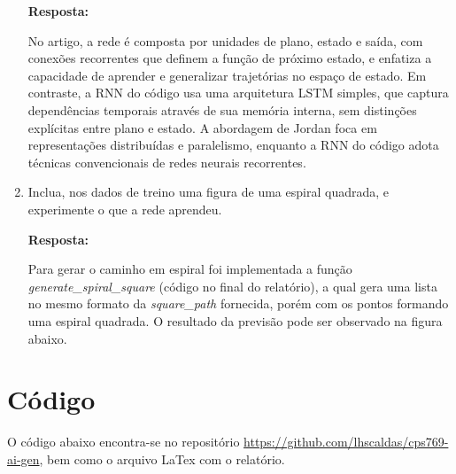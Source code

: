 \documentclass[12 pt]{article}
\begin{document}
\begin{enumerate}
    \textbf{Resposta:} \par

    No artigo, a rede é composta por unidades de plano, estado e saída, com conexões recorrentes que definem a função de próximo estado, e enfatiza a capacidade de aprender e generalizar trajetórias no espaço de estado. Em contraste, a RNN do código usa uma arquitetura LSTM simples, que captura dependências temporais através de sua memória interna, sem distinções explícitas entre plano e estado. A abordagem de Jordan foca em representações distribuídas e paralelismo, enquanto a RNN do código adota técnicas convencionais de redes neurais recorrentes.

    \item Inclua, nos dados de treino uma figura de uma espiral quadrada, e experimente o que a rede aprendeu.
        
    \textbf{Resposta:} \par

    Para gerar o caminho em espiral foi implementada a função \textit{generate\_spiral\_square} (código no final do relatório), a qual gera uma lista no mesmo formato da \textit{square\_path} fornecida, porém com os pontos formando uma espiral quadrada. O resultado da previsão pode ser observado na figura abaixo.

\end{enumerate}

\section*{Código}

O código abaixo encontra-se no repositório \href{https://github.com/lhscaldas/cps769-ai-gen}{https://github.com/lhscaldas/cps769-ai-gen}, bem como o arquivo LaTex com o relatório.



\end{document}
